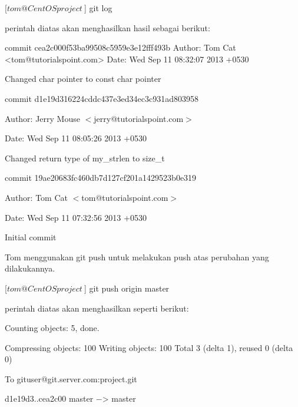[$tom@CentOS project ~$] git log\vspace{12pt}

perintah diatas akan menghasilkan hasil sebagai berikut:\vspace{12pt}

commit cea2c000f53ba99508c5959e3e12fff493b
Author: Tom Cat <tom@tutorialspoint.com>
Date: Wed Sep 11 08:32:07 2013 +0530

Changed char pointer to const char pointer


commit d1e19d316224cddc437e3ed34ec3c931ad803958

Author: Jerry Mouse $<$jerry@tutorialspoint.com$>$

Date: Wed Sep 11 08:05:26 2013 +0530

Changed return type of my\_strlen to size\_t

commit 19ae20683fc460db7d127cf201a1429523b0e319

Author: Tom Cat $<$tom@tutorialspoint.com$>$

Date: Wed Sep 11 07:32:56 2013 +0530

Initial commit\vspace{12pt}

Tom menggunakan git push untuk melakukan push atas perubahan yang dilakukannya.\par
\vspace{12pt}


[$tom@CentOS project ~$] git push origin master\par
\vspace{12pt}
perintah diatas akan menghasilkan seperti berikut:\par
\vspace{12pt}
Counting objects: 5, done.\par
\vspace{12pt}
Compressing objects: 100%
\vspace{12pt}
Writing objects: 100%
\vspace{12pt}
Total 3 (delta 1), reused 0 (delta 0)\par
\vspace{12pt}
To gituser@git.server.com:project.git\par
\vspace{12pt}
d1e19d3..cea2c00 master −> master\par



